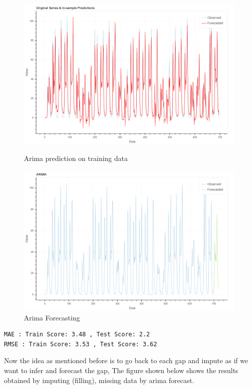 \begin{figure}[H]
\centering
\begin{minipage}{.49\linewidth}
    \includegraphics[width=.9\textwidth]{img/arima_training.png}    
    \caption{Arima prediction on training data}
    \label{fig:trainig_arima}
\end{minipage}
\hfill
\begin{minipage}{.49\linewidth}
    \includegraphics[width=.9\textwidth]{img/arima_forcasting.png} 
    \caption{Arima Forecasting}
    \label{fig:forcasting}
\end{minipage}
\end{figure}
%
\begin{verbatim}
MAE : Train Score: 3.48 , Test Score: 2.2
RMSE : Train Score: 3.53 , Test Score: 3.62
\end{verbatim}
%
Now the idea as mentioned before is to go back to each gap and impute as if we want to infer and forecast the gap, The figure shown below shows the results obtained by imputing (filling), missing data by arima forecast.

